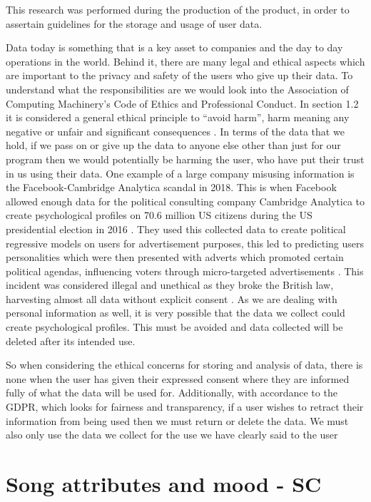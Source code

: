 \documentclass[10pt]{report}
\begin{document}
This research was performed during the production of the product, in order to assertain guidelines for the storage and usage of user data.\newline

Data today is something that is a key asset to companies and the day to day operations in the world. Behind it, there are many legal and ethical aspects which are important to the privacy and safety of the users who give up their data. To understand what the responsibilities are we would look into the Association of Computing  Machinery’s Code of Ethics and Professional Conduct. In section 1.2 it is considered a general ethical principle to “avoid harm”, harm meaning any negative or unfair and significant consequences \cite{ComputingMachineryACM2018}. In terms of the data that we hold, if we pass on or give up the data to anyone else other than just for our program then we would potentially be harming the user, who have put their trust in us using their data. One example of a large company misusing information is the Facebook-Cambridge Analytica scandal in 2018. This is when Facebook allowed enough data for the political consulting company Cambridge Analytica to create psychological profiles on 70.6 million US citizens during the US presidential election in 2016 \cite{Horwitz2018}. They used this collected data to create political regressive models on users for advertisement purposes, this led to predicting users personalities which were then presented with adverts which promoted certain political agendas, influencing voters through micro-targeted advertisements \cite{Rathi2019}. This incident was considered illegal and unethical as they broke the British law, harvesting almost all data without explicit consent \cite{ASNC2018}. As we are dealing with personal information as well, it is very possible that the data we collect could create psychological profiles. This must be avoided and data collected will be deleted after its intended use.

So when considering the ethical concerns for storing and analysis of data, there is none when the user has given their expressed consent where they are informed fully of what the data will be used for. Additionally, with accordance to the GDPR, which looks for fairness and transparency, if a user wishes to retract their information from being used then we must return or delete the data. We must also only use the data we collect for the use we have clearly said to the user


\section{Song attributes and mood - SC}
\label{res:mood}
\end{document}
